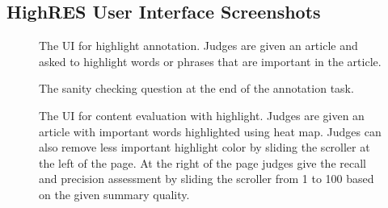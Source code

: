 \documentclass[11pt,a4paper]{article}
\begin{document}
\subsection{HighRES User Interface Screenshots}
\begin{figure}[h]
    \centering
    \caption{The UI for highlight annotation. Judges are given an article and asked to highlight words or phrases that are important in the article.}
    \label{fig:my_label}
\end{figure}
\begin{figure}[h]
    \centering
    \caption{The sanity checking question at the end of the annotation task.}
    \label{fig:my_label}
\end{figure}
\begin{figure}[h]
    \centering
    \caption{The UI for content evaluation with highlight. Judges are given an article with important words highlighted using heat map. Judges can also remove less important highlight color by sliding the scroller at the left of the page. At the right of the page judges give the recall and precision assessment by sliding the scroller from 1 to 100 based on the given summary quality.}
    \label{fig:my_label}
\end{figure}
\end{document}
